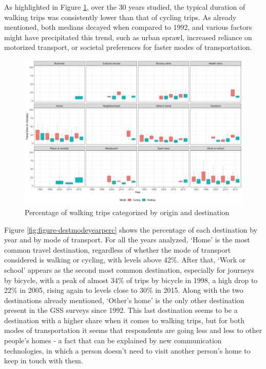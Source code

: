 \documentclass[preprint, 3p,
authoryear]{elsarticle} %
\begin{document}
As highlighted in Figure \ref{fig:figure-boxplot}, over the 30 years
studied, the typical duration of walking trips was consistently lower
than that of cycling trips. As already mentioned, both medians decayed
when compared to 1992, and various factors might have precipitated this
trend, such as urban sprawl, increased reliance on motorized transport,
or societal preferences for faster modes of transportation.

\begin{figure}
\includegraphics[width=1\linewidth]{figures/destination_boxplots} \caption{Percentage of walking trips categorized by origin and destination}\label{fig:figure-boxplot}
\end{figure}

Figure \ref{fig:figure-destmodeyearperc} shows the percentage of each
destination by year and by mode of transport. For all the years
analyzed, `Home' is the most common travel destination, regardless of
whether the mode of transport considered is walking or cycling, with
levels above 42\%. After that, `Work or school' appears as the second
most common destination, especially for journeys by bicycle, with a peak
of almost 34\% of trips by bicycle in 1998, a high drop to 22\% in 2005,
rising again to levels close to 30\% in 2015. Along with the two
destinations already mentioned, `Other's home' is the only other
destination present in the GSS surveys since 1992. This last destination
seems to be a destination with a higher share when it comes to walking
trips, but for both modes of transportation it seems that respondents
are going less and less to other people's homes - a fact that can be
explained by new communication technologies, in which a person doesn't
need to visit another person's home to keep in touch with them.
\end{document}

